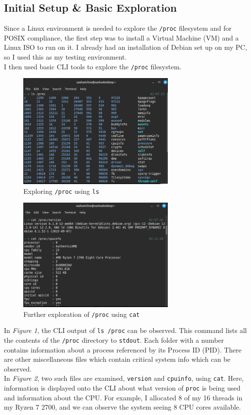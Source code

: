 \subsection{Initial Setup \& Basic Exploration}\label{subsec:steps-1-3:-initial-setup-&-basic-exploration}
Since a Linux environment is needed to explore the \texttt{/proc} filesystem
and for POSIX compliance, the first step was to install a Virtual Machine (VM)
and a Linux ISO to run on it.
I already had an installation of Debian set up on my PC, so I used this as my testing environment.\\
I then used basic CLI tools to explore the \texttt{/proc} filesystem.
\begin{figure}[H]
    \centering
    \includegraphics[width=0.7\textwidth]{../../screenshots/step1-lsproc}
    \caption{Exploring \texttt{/proc} using \texttt{ls}}
    \label{fig:step1-lsproc}
\end{figure}
\begin{figure}[H]
    \centering
    \includegraphics[width=0.7\textwidth]{../../screenshots/step2-3-catproc}
    \caption{Further exploration of \texttt{/proc} using \texttt{cat}}
    \label{fig:step2-3-catproc}
\end{figure}
\noindent
In \textit{Figure 1}, the CLI output of \texttt{ls /proc} can be observed.
This command lists all the contents of the \texttt{/proc} directory to \texttt{stdout}.
Each folder with a number contains information about a process referenced by its Process ID (PID)\@.
There are other miscellaneous files which contain critical system info which can be observed.\\
In \textit{Figure 2}, two such files are examined, \texttt{version} and \texttt{cpuinfo}, using \texttt{cat}.
Here, information is displayed onto the CLI about what version of \texttt{proc} is being used
and information about the CPU\@.
For example, I allocated 8 of my 16 threads in my Ryzen 7 2700,
and we can observe the system seeing 8 CPU cores available.

